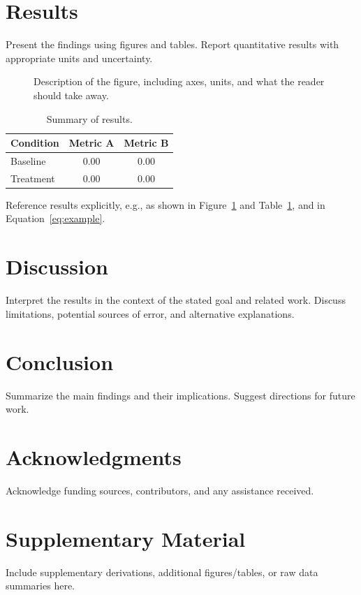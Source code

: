 \documentclass[11pt, a4paper]{article}
\begin{document}
\section{Results}
\label{sec:results}

Present the findings using figures and tables. Report quantitative results
with appropriate units and uncertainty.

\begin{figure}[H]
    \centering
    \caption{Description of the figure, including axes, units, and what
    the reader should take away.}
    \label{fig:example}
\end{figure}

\begin{table}[H]
    \centering
    \caption{Summary of results.}
    \label{tab:example}
    \begin{tabular}{lcc}
        \toprule
        Condition & Metric A & Metric B \\
        \midrule
        Baseline  & 0.00     & 0.00     \\
        Treatment & 0.00     & 0.00     \\
        \bottomrule
    \end{tabular}
\end{table}

Reference results explicitly, e.g., as shown in Figure~\ref{fig:example}
and Table~\ref{tab:example}, and in Equation~\ref{eq:example}.

\section{Discussion}
\label{sec:discussion}

Interpret the results in the context of the stated goal and related work.
Discuss limitations, potential sources of error, and alternative
explanations.

\section{Conclusion}
\label{sec:conclusion}

Summarize the main findings and their implications. Suggest directions for
future work.

\section*{Acknowledgments}
Acknowledge funding sources, contributors, and any assistance received.




\appendix
\section{Supplementary Material}
\label{sec:appendix}

Include supplementary derivations, additional figures/tables, or raw data
summaries here.
\end{document}
